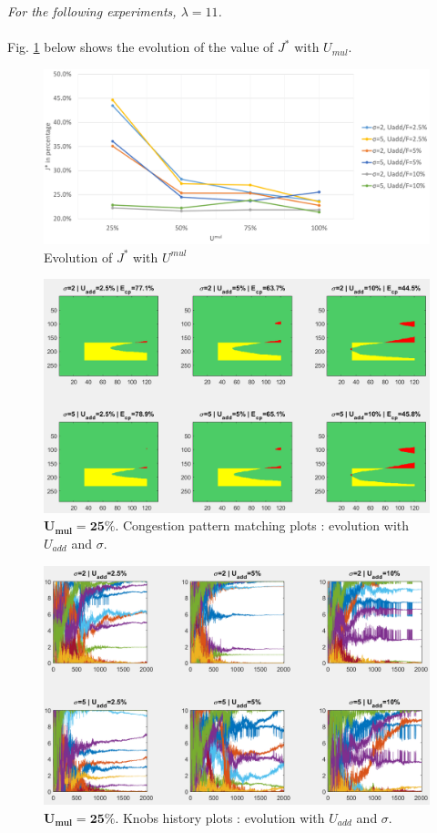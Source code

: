 \emph{For the following experiments, $\lambda=11$.}\\
\\
Fig. \ref{fig:umulevolution} below shows the evolution of the value of $J^{*}$ with $U_{mul}$.
\begin{figure}[h]
	\label{fig:umulevolution}
	\caption{Evolution of $J^{*}$ with $U^{mul}$}
	\includegraphics[width=7in]{figures/umul.png}
\end{figure}
\begin{figure}
	\label{fig:umulcp25}
	\caption{$\mathbf{U_{mul}=25\%}$. Congestion pattern matching plots : evolution with $U_{add}$ and $\sigma$.}
	\includegraphics[width=7in]{figures/results_figures/Umul/cp_Umul_25_lambda_11.png}
\end{figure}	
\begin{figure}
	\label{fig:umulknobs25}
	\caption{$\mathbf{U_{mul}=25\%}$. Knobs history plots : evolution with $U_{add}$ and $\sigma$.}
	\includegraphics[width=7in]{figures/results_figures/Umul/knobs_Umul_25_lambda_11.png}
\end{figure}	
